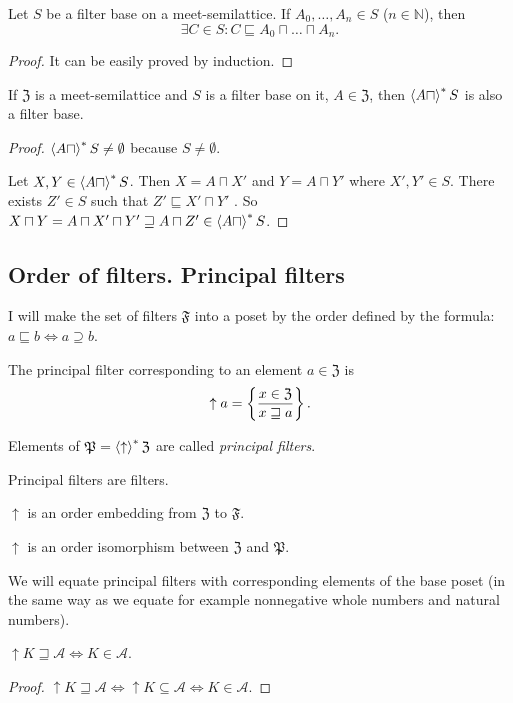 \begin{prop}
Let $S$ be a filter base on a meet-semilattice. If $A_{0},\ldots,A_{n}\in S$
($n\in\mathbb{N}$), then
\[
\exists C\in S:C\sqsubseteq A_{0}\sqcap\dots\sqcap A_{n}.
\]
\end{prop}
\begin{proof}
It can be easily proved by induction.\end{proof}
\begin{prop}
If $\mathfrak{Z}$ is a meet-semilattice and $S$ is a filter base
on it, $A\in\mathfrak{Z}$, then $\left\langle A\sqcap\right\rangle ^{\ast}S$ is also a filter
base.\end{prop}
\begin{proof}
$\left\langle A\sqcap\right\rangle ^{\ast}S\ne\emptyset$ because $S\ne\emptyset$.

Let $X,Y\in\left\langle A\sqcap\right\rangle ^{\ast}S$. Then $X=A\sqcap X'$ and $Y=A\sqcap Y'$
where $X',Y'\in S$. There exists $Z'\in S$ such that $Z'\sqsubseteq X'\sqcap Y'$
. So $X\sqcap Y=A\sqcap X'\sqcap Y'\sqsupseteq A\sqcap Z'\in\left\langle A\sqcap\right\rangle ^{\ast}S$.
\end{proof}

\subsection{Order of filters. Principal filters}

I will make the set of filters $\mathfrak{F}$ into a poset by the
order defined by the formula: $a\sqsubseteq b\Leftrightarrow a\supseteq b$.
\begin{defn}
The principal filter corresponding to an
element $a\in\mathfrak{Z}$ is
\[
\uparrow a=\left\{ \frac{x\in\mathfrak{Z}}{x\sqsupseteq a}\right\}.
\]


Elements of $\mathfrak{P}=\left\langle \uparrow\right\rangle ^{\ast}\mathfrak{Z}$ are called
\emph{principal filters}.\end{defn}
\begin{obvious}
Principal filters are filters.
\end{obvious}

\begin{obvious}
$\uparrow$ is an order embedding from $\mathfrak{Z}$ to $\mathfrak{F}$.\end{obvious}
\begin{cor}
$\uparrow$ is an order isomorphism between $\mathfrak{Z}$ and $\mathfrak{P}$.
\end{cor}
We will equate principal filters with corresponding elements of the
base poset (in the same way as we equate for example nonnegative whole
numbers and natural numbers).
\begin{prop}
$\uparrow K\sqsupseteq\mathcal{A}\Leftrightarrow K\in\mathcal{A}$.\end{prop}
\begin{proof}
$\uparrow K\sqsupseteq\mathcal{A}\Leftrightarrow\uparrow K\subseteq\mathcal{A}\Leftrightarrow K\in\mathcal{A}$.
\end{proof}

